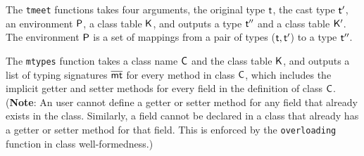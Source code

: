 \documentclass[a4paper,USenglish]{tex/lipics-v2016}
\begin{document}
\begin{mathpar}

\end{mathpar}


% 

The \texttt{tmeet} functions takes four arguments, the original type
$\t$, the cast type $\tp$, an environment $\P$, a class table $\K$, and
outputs a type $\tpp$ and a class table $\Kp$. The environment $\P$ is a set
of mappings from a pair of types ($\t,\tp$) to a type $\tpp$.

The \texttt{mtypes} function takes a class name $\C$ and the class table
$\K$, and outputs a list of typing signatures $\b\mt$ for every method in
class $\C$, which includes the implicit getter and setter methods for every
field in the definition of class $\C$.  (\textbf{Note}: An user cannot
define a getter or setter method for any field that already exists in the
class. Similarly, a field cannot be declared in a class that already has a
getter or setter method for that field. This is enforced by the
\texttt{overloading} function in class well-formedness.)

\hrulefill
\end{document}
